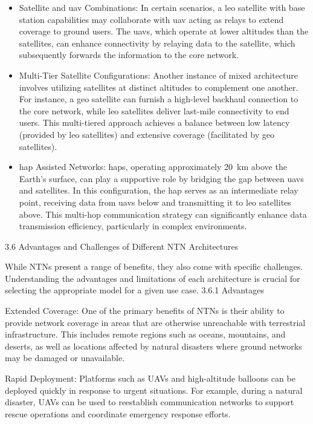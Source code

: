 \begin{itemize}
  \item Satellite and \gls{uav} Combinations: In certain scenarios, a \gls{leo} satellite with base station capabilities may collaborate with \gls{uav} acting as relays to extend coverage to ground users. The \glspl{uav}, which operate at lower altitudes than the satellites, can enhance connectivity by relaying data to the satellite, which subsequently forwards the information to the core network.

  \item Multi-Tier Satellite Configurations: Another instance of mixed architecture involves utilizing satellites at distinct altitudes to complement one another. For instance, a \gls{geo} satellite can furnish a high-level backhaul connection to the core network, while \gls{leo} satellites deliver last-mile connectivity to end users. This multi-tiered approach achieves a balance between low latency (provided by \gls{leo} satellites) and extensive coverage (facilitated by \gls{geo} satellites).

  \item \gls{hap} Assisted Networks: \glspl{hap}, operating approximately \SI{20}{\kilo\meter} above the Earth's surface, can play a supportive role by bridging the gap between \glspl{uav} and satellites. In this configuration, the \gls{hap} serves as an intermediate relay point, receiving data from \glspl{uav} below and transmitting it to \gls{leo} satellites above. This multi-hop communication strategy can significantly enhance data transmission efficiency, particularly in complex environments.
\end{itemize}

3.6 Advantages and Challenges of Different NTN Architectures

While NTNs present a range of benefits, they also come with specific challenges. Understanding the advantages and limitations of each architecture is crucial for selecting the appropriate model for a given use case.
3.6.1 Advantages

Extended Coverage: One of the primary benefits of NTNs is their ability to provide network coverage in areas that are otherwise unreachable with terrestrial infrastructure. This includes remote regions such as oceans, mountains, and deserts, as well as locations affected by natural disasters where ground networks may be damaged or unavailable.

Rapid Deployment: Platforms such as UAVs and high-altitude balloons can be deployed quickly in response to urgent situations. For example, during a natural disaster, UAVs can be used to reestablish communication networks to support rescue operations and coordinate emergency response efforts.

